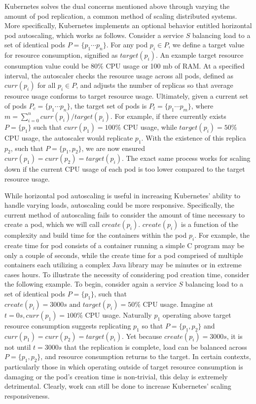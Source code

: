 \documentclass[letterpaper,11pt,twocolumn]{article}
\begin{document}
Kubernetes solves the dual concerns mentioned above through varying the amount
of pod replication, a common method of scaling distributed systems.\cite[pg.
15]{distributed-systems-principles-and-paradigms} More specifically, Kubernetes
implements an optional behavior entitled horizontal pod autoscaling, which works
as follows. Consider a service $S$ balancing load to a set of identical pods $P =
\{p_{1} \cdots p_{n}\}$. For any pod $p_{i} \in P$, we define a target value for
resource consumption, signified as $target(p_{i})$. An example target resource
consumption value could be $80\%$ CPU usage or 100 mb of RAM. At a specified
interval, the autoscaler checks the resource usage across all pods, defined as
$curr(p_{i})$ for all $p_{i} \in P$, and adjusts the number of replicas so that
average resource usage conforms to target resource usage. Ultimately, given a
current set of pods $P_{c} = \{p_{1} \cdots p_{n}\}$, the target set
of pods is $P_{t} = \{p_{1} \cdots p_{m}\}$, where $m = \sum_{i =
0}^{n} curr(p_{i}) / target(p_{i})$. For example, if there currently exists
$P = \{p_{1}\}$ such that $curr(p_{1}) = 100\%$ CPU usage, while
$target(p_{i}) = 50\%$ CPU usage, the autoscaler would replicate
$p_{1}$. With the existence of this replica $p_{2}$, such that $P =
\{p_{1}, p_{2}\}$, we are now ensured $curr(p_{1}) = curr(p_{2}) =
target(p_{i})$. The exact same process works for scaling down if the current CPU
usage of each pod is too lower compared to the target resource
usage.\cite{k8s-horizontal-pod-autoscaler-proposal}

While horizontal pod autoscaling is useful in increasing Kubernetes' ability to
handle varying loads, autoscaling could be more responsive. Specifically, the
current method of autoscaling fails to consider the amount of time necessary to
create a pod, which we will call
$create(p_{i})$.\cite{brendan-burns-conversation} $create(p_{i})$ is a function
of the complexity and build time for the containers within the pod $p_{i}$. For
example, the create time for pod consists of a container running
a simple C program may be only a couple
of seconds, while the create time for a pod comprised of multiple containers each
utilizing a complex Java library may be minutes or in extreme cases hours. To
illustrate the necessity of considering pod creation time, consider the
following example.
To begin, consider again a service $S$ balancing load to a set of identical pods
$P = \{p_{1}\}$, such that $create(p_{i}) = 3000s \mbox{ and } target(p_{i}) =
50\%$ CPU usage. Imagine at $t = 0s, curr(p_{1}) = 100\%$ CPU usage. Naturally
$p_{1}$ operating above target resource consumption suggests replicating
$p_{1}$ so that $P = \{p_{1}, p_{2}\}$ and $curr(p_{1}) = curr(p_{2}) =
target(p_{i})$. Yet because $create(p_{i}) = 3000s$, it is not until $t = 3000s$
that the replication is complete, load can be balanced across $P =
\{p_{1}, p_{2}\}$, and resource consumption returns to the target. In certain
contexts, particularly those in which operating outside of target resource
consumption is damaging or the pod's creation time is non-trivial, this delay is
extremely detrimental. Clearly, work can still be done to increase Kubernetes'
scaling responsiveness.
\end{document}
